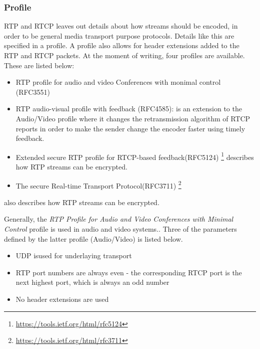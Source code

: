 \subsubsection{Profile} \label{sec:design:profile}
RTP and RTCP leaves out details about how streams should be encoded, in order to be general media transport purpose protocols. Details like this are specified in a profile. A profile also allows for header extensions added to the RTP and RTCP packets.
At the moment of writing, four profiles are available. These are listed below:
\begin{itemize}
	\item RTP profile for audio and video Conferences with monimal control (RFC3551)
	
	\item RTP audio-visual profile with feedback (RFC4585):  is an extension to the Audio/Video profile where it changes the retransmission algorithm of RTCP reports in order to make the sender change the encoder faster using timely feedback.
	
	\item Extended secure RTP profile for RTCP-based feedback(RFC5124) \footnote{\url{https://tools.ietf.org/html/rfc5124}} describes how RTP streams can be encrypted.
	 
	\item The secure Real-time Transport Protocol(RFC3711) \footnote{\url{https://tools.ietf.org/html/rfc3711}}
\end{itemize} \citep{johnston2004sip} also describes how RTP streams can be encrypted.


\noindent  Generally, the \textit{RTP Profile for Audio and Video Conferences with Minimal Control} profile is used in audio and video systems.\citep{perkins2003rtp}.
Three of the parameters defined by the latter profile (Audio/Video) is listed below\citep{johnston2004sip}.
\begin{itemize}
	\item UDP isused for underlaying transport
	\item RTP port numbers are always even - the corresponding RTCP port is the next highest port, which is always an odd number
	\item No header extensions are used
\end{itemize} 

